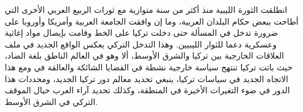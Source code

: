 \documentclass{article}
\begin{document}
\beginnumbering
{}
\pstart[\setRL\arabicfont] %
انطلقت الثورة الليبية منذ أكثر من سنة
متوازية مع ثورات الربيع العربي الأخرى التي أطاحت ببعض حكام البلدان
العربية، وما إن وافقت الجامعة العربية وأمريكا وأوروبا على ضرورة تدخل
في المسألة حتى دخلت تركيا على الخط وقامت بإيصال مواد إغاثية وعسكرية
دعما للثوار الليبيين. وهذا التدخل التركي يعكس الواقع الجديد في ملف
العلاقات الخارجية بين تركيا والشرق الأوسط، ألا وهو  في العالم الناطق بلغة الضاد، حيث باتت تركيا تنتهج سياسة خارجية نشطة في القضايا الشائكة والعالقة في  ومع هذا الاتجاه الجديد في
سياسات تركيا، ينبغي تحديد معالم دور تركيا الجديد، ومحددات هذا الدور
في ضوء التغيرات الأخيرة في المنطقة، وكذلك تحديد آراء العرب حيال
الموقف التركي في الشرق الأوسط.
\pend
\endnumbering
\end{document}
